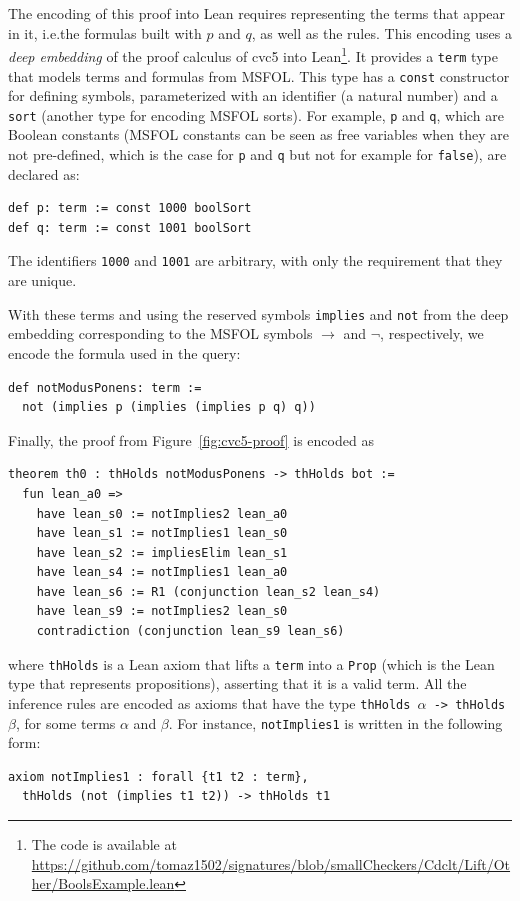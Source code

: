 The encoding of this proof into Lean requires representing the terms that appear
in it, i.e.the formulas built with $p$ and $q$, as well as the rules.
%
This encoding uses a \emph{deep embedding} of the proof calculus of cvc5 into
Lean\footnote{The code is available at \url{https://github.com/tomaz1502/signatures/blob/smallCheckers/Cdclt/Lift/Other/BoolsExample.lean}}.
%
It provides a \texttt{term} type that models terms and formulas from MSFOL. This type has
a \texttt{const} constructor for defining symbols, parameterized with an
identifier (a natural number) and a \texttt{sort} (another type for encoding MSFOL
sorts).
%
For example, \texttt{p} and \texttt{q}, which are Boolean constants (MSFOL
constants can be seen as free variables when they are not pre-defined, which is
the case for \texttt{p} and \texttt{q} but not for example for \texttt{false}),
are declared as:

\begin{verbatim}
def p: term := const 1000 boolSort
def q: term := const 1001 boolSort
\end{verbatim}

The identifiers \texttt{1000} and \texttt{1001} are arbitrary, with only the
requirement that they are unique.

With these terms and using the reserved symbols \texttt{implies} and
\texttt{not} from the deep embedding corresponding to the MSFOL symbols
$\rightarrow$ and $\neg$, respectively, we encode the formula used in the
query:

\begin{verbatim}
def notModusPonens: term :=
  not (implies p (implies (implies p q) q))
\end{verbatim}

Finally, the proof from Figure~\ref{fig:cvc5-proof} is encoded as

\begin{verbatim}
theorem th0 : thHolds notModusPonens -> thHolds bot :=
  fun lean_a0 =>
    have lean_s0 := notImplies2 lean_a0
    have lean_s1 := notImplies1 lean_s0
    have lean_s2 := impliesElim lean_s1
    have lean_s4 := notImplies1 lean_a0
    have lean_s6 := R1 (conjunction lean_s2 lean_s4)
    have lean_s9 := notImplies2 lean_s0
    contradiction (conjunction lean_s9 lean_s6)
\end{verbatim}

where \texttt{thHolds} is a Lean axiom that lifts a \texttt{term} into a \texttt{Prop} (which is the Lean type that represents propositions), asserting that it is a valid term. All the inference rules are encoded as axioms that have the type \texttt{thHolds $\alpha$ -> thHolds $\beta$}, for some terms $\alpha$ and $\beta$. For instance, \texttt{notImplies1} is written in the following form:
\begin{verbatim}
axiom notImplies1 : forall {t1 t2 : term},
  thHolds (not (implies t1 t2)) -> thHolds t1
\end{verbatim}

